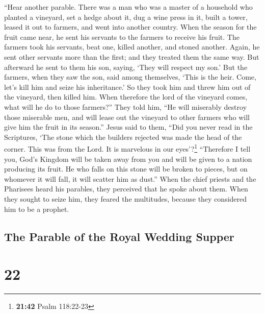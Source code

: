  ``Hear another parable. There was a man who was a master
of a household who planted a vineyard, set a hedge about it, dug a wine
press in it, built a tower, leased it out to farmers, and went into
another country.  When the season for the fruit came
near, he sent his servants to the farmers to receive his fruit.
 The farmers took his servants, beat one, killed another,
and stoned another.  Again, he sent other servants more
than the first; and they treated them the same way.  But
afterward he sent to them his son, saying, `They will respect my son.'
 But the farmers, when they saw the son, said among
themselves, `This is the heir. Come, let's kill him and seize his
inheritance.'  So they took him and threw him out of the
vineyard, then killed him.  When therefore the lord of
the vineyard comes, what will he do to those farmers?'' 
They told him, ``He will miserably destroy those miserable men, and will
lease out the vineyard to other farmers who will give him the fruit in
its season.''  Jesus said to them, ``Did you never read
in the Scriptures, `The stone which the builders rejected was made the
head of the corner. This was from the Lord. It is marvelous in our
eyes'?\footnote{\textbf{21:42} Psalm 118:22-23} 
``Therefore I tell you, God's Kingdom will be taken away from you and
will be given to a nation producing its fruit.  He who
falls on this stone will be broken to pieces, but on whomever it will
fall, it will scatter him as dust.''  When the chief
priests and the Pharisees heard his parables, they perceived that he
spoke about them.  When they sought to seize him, they
feared the multitudes, because they considered him to be a prophet.

\hypertarget{the-parable-of-the-royal-wedding-supper}{%
\subsection{The Parable of the Royal Wedding
Supper}\label{the-parable-of-the-royal-wedding-supper}}

\hypertarget{section-21}{%
\section{22}\label{section-21}}

